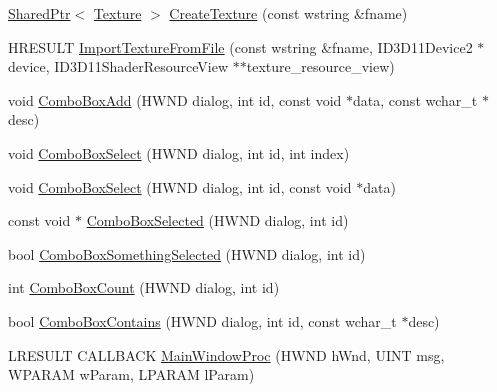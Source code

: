 \begin{DoxyCompactItemize}
\item 
\hyperlink{namespacemage_a1e01ae66713838a7a67d30e44c67703e}{Shared\+Ptr}$<$ \hyperlink{classmage_1_1_texture}{Texture} $>$ \hyperlink{namespacemage_ac27913e621bde0fd01312183aafaaca0}{Create\+Texture} (const wstring \&fname)
\item 
H\+R\+E\+S\+U\+LT \hyperlink{namespacemage_ad3c9a6b3f339b92985d202e5cd0f4388}{Import\+Texture\+From\+File} (const wstring \&fname, I\+D3\+D11\+Device2 $\ast$device, I\+D3\+D11\+Shader\+Resource\+View $\ast$$\ast$texture\+\_\+resource\+\_\+view)
\item 
void \hyperlink{namespacemage_a78e4a1d3c21d6eb8657bfa0a9631d6ee}{Combo\+Box\+Add} (H\+W\+ND dialog, int id, const void $\ast$data, const wchar\+\_\+t $\ast$desc)
\item 
void \hyperlink{namespacemage_aa510d1e5e45102338fce66ae46b2b267}{Combo\+Box\+Select} (H\+W\+ND dialog, int id, int index)
\item 
void \hyperlink{namespacemage_a026dd5ecb1cea93f38193f403e878d23}{Combo\+Box\+Select} (H\+W\+ND dialog, int id, const void $\ast$data)
\item 
const void $\ast$ \hyperlink{namespacemage_affa0d91f266dfbe4ed4a29c26b04dcb8}{Combo\+Box\+Selected} (H\+W\+ND dialog, int id)
\item 
bool \hyperlink{namespacemage_afa2451527062c4213d21bdf01b1922c6}{Combo\+Box\+Something\+Selected} (H\+W\+ND dialog, int id)
\item 
int \hyperlink{namespacemage_a5c586938d7f59a82c8528fab41f17960}{Combo\+Box\+Count} (H\+W\+ND dialog, int id)
\item 
bool \hyperlink{namespacemage_a98228034fca63017765bcdf5966be239}{Combo\+Box\+Contains} (H\+W\+ND dialog, int id, const wchar\+\_\+t $\ast$desc)
\item 
L\+R\+E\+S\+U\+LT C\+A\+L\+L\+B\+A\+CK \hyperlink{namespacemage_a7ab7652c75189226bf8299647e897c99}{Main\+Window\+Proc} (H\+W\+ND h\+Wnd, U\+I\+NT msg, W\+P\+A\+R\+AM w\+Param, L\+P\+A\+R\+AM l\+Param)
\end{DoxyCompactItemize}
